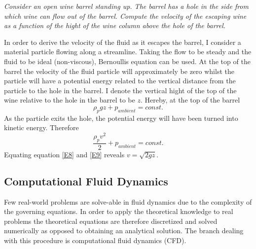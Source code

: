 \begin{example}
	\emph{Consider an open wine barrel standing up. The barrel has a hole in the side from which wine can flow out of the barrel. Compute the velocity of the escaping wine as a function of the hight of the wine column above the hole of the barrel.}\newline
	
	In order to derive the velocity of the fluid as it escapes the barrel, I consider a material particle flowing along a streamline. Taking the flow to be steady and the fluid to be ideal (non-viscous), Bernoullis equation can be used. At the top of the barrel the velocity of the fluid particle will approximately be zero whilst the particle will have a potential energy related to the vertical distance from the particle to the hole in the barrel. I denote the vertical hight of the top of the wine relative to the hole in the barrel to be $z$. Hereby, at the top of the barrel
	\begin{equation}
		\rho_pgz+p_{ambient}=const.
		\label{E8}
	\end{equation} 
	As the particle exits the hole, the potential energy will have been turned into kinetic energy. Therefore
	\begin{equation}
		\frac{\rho_p v^2}{2}+p_{ambient}=const.
		\label{E9}
	\end{equation} 
	Equating equation \eqref{E8} and \eqref{E9} reveals $v=\sqrt{2gz}$. 
	
\end{example}

\subsection{Computational Fluid Dynamics}
Few real-world problems are solve-able in fluid dynamics due to the complexity of the governing equations. In order to apply the theoretical knowledge to real problems the theoretical equations are therefore discretized and solved numerically as opposed to obtaining an analytical solution. The branch dealing with this procedure is computational fluid dynamics (CFD).


